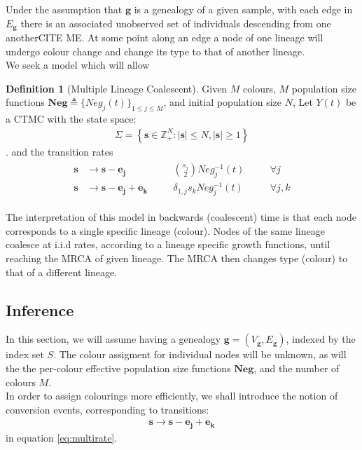 \documentclass{report}
\newcommand{\Z}{\mathbb{Z}}
\newcommand{\CITEMISSING}{\colorbox{BurntOrange}{CITE ME}}
\theoremstyle{definition}
\newtheorem{definition}{Definition}[section]
\begin{document}
Under the assumption that $\mathbf{g}$ is a genealogy of a given sample, with each edge in $E_\mathbf{g}$ there is an associated unobserved set of individuals descending from one another\CITEMISSING. At some point along an edge a node of one lineage will undergo colour change and change its type to that of another lineage.\\
We seek a model which will allow
\begin{definition}[Multiple Lineage Coalescent]
Given $M$ colours, $M$ population size functions $\mathbf{Neg}\triangleq\{Neg_j(t)\}_{1\leq j\leq M}$, and initial population size $N$, Let $Y(t)$ be a CTMC with the state space:
\begin{gather}
  \Sigma = \left\{\mathbf{s}\in \Z_+^{N}:|\mathbf{s}|\leq N, |\mathbf{s}|\geq1\right\}
\end{gather}.
and the transition rates
\begin{gather}\label{eq:multirate}
\begin{align}
\mathbf{s}&\to\mathbf{s}-\mathbf{e_j} &\quad& \binom{s_j}{2}Neg_j^{-1}(t)&\quad&\forall j\\
\mathbf{s}&\to\mathbf{s}-\mathbf{e_j}+\mathbf{e_k}&\quad& \delta_{1,j}s_kNeg_j^{-1}(t)&\quad&\forall j,k
\end{align}
\end{gather}
\end{definition}
The interpretation of this model in backwards (coalescent) time is that each node corresponds to a single specific lineage (colour). Nodes of the same lineage coalesce at i.i.d rates, according to a lineage specific growth functions, until reaching the MRCA of given lineage. The MRCA then changes type (colour) to that of a different lineage. 
\subsection{Inference}
In this section, we will assume having a genealogy $\mathbf{g}=(V_\mathbf{g}, E_\mathbf{g})$, indexed by the index set $S$. The colour assigment for individual nodes will be unknown, as will the the per-colour effective population size functions $\mathbf{Neg}$, and the number of colours $M$.\\

In order to assign colourings more efficiently, we shall introduce the notion of conversion events, corresponding to transitions:
\begin{gather*}
\mathbf{s}\to\mathbf{s}-\mathbf{e_j}+\mathbf{e_k}
\end{gather*}
in equation \ref{eq:multirate}.\\
\end{document}
